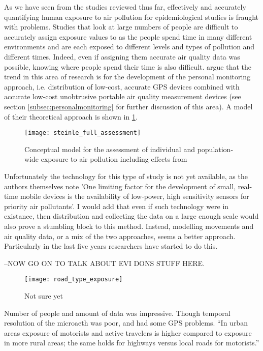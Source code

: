 As we have seen from the studies reviewed thus far, effectively and accurately quantifying human exposure to air pollution for epidemiological studies is fraught with problems. Studies that look at large numbers of people are difficult to accurately assign exposure values to as the people spend time in many different environments and are each exposed to different levels and types of pollution and different times. Indeed, even if assigning them accurate air quality data was possible, knowing where people spend their time is also difficult. \cite{Steinle2013} argue that the trend in this area of research is for the development of the personal monitoring approach, i.e. distribution of low-cost, accurate GPS devices combined with accurate low-cost unobtrusive portable air quality measurement devices (see section \ref{subsec:personalmonitoring} for further discussion of this area). A model of their theoretical approach is shown in \ref{fig:steinle_full_assessment}.

\begin{figure}[H]
\centering
\texttt{[image: steinle\_full\_assessment]}
\caption{Conceptual model for the assessment of individual and population-wide exposure to air pollution including effects from \cite{Steinle2013}}
\label{fig:steinle_full_assessment}
\end{figure}

Unfortunately the technology for this type of study is not yet available, as the authors themselves note 'One limiting factor for the development of small, real-time mobile devices is the availability of low-power, high sensitivity sensors for priority air pollutants'.  I would add that even if such technology were in existance, then distribution and collecting the data on a large enough scale would also prove a stumbling block to this method.  Instead, modelling movements and air quality data, or a mix of the two approaches, seems a better approach. Particularly in the last five years researchers have started to do this.

--NOW GO ON TO TALK ABOUT EVI DONS STUFF HERE.


\begin{figure}[H]
\centering
\texttt{[image: road\_type\_exposure]}
\caption{Not sure yet}
\label{fig:road_type_exposure}
\end{figure}

Number of people and amount of data was impressive.
Though temporal resolution of the microaeth was poor, and had some GPS problems.
“In urban areas exposure of motorists and active travelers is higher compared to exposure in more rural areas; the same holds for highways versus local roads for motorists.”

